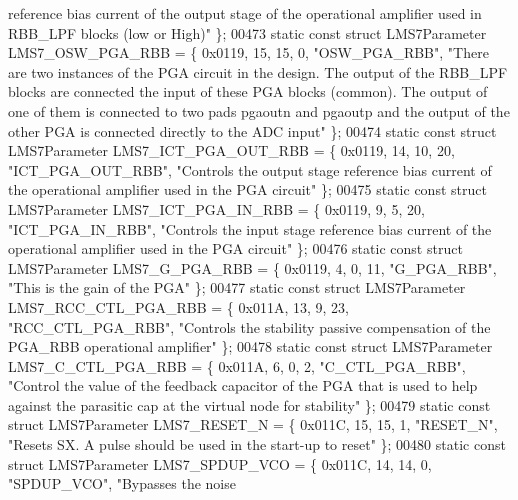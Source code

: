 \begin{DoxyCode}
{       reference bias current of the output stage of the operational amplifier used in RBB\_LPF blocks (low or High)"} \};
00473 \textcolor{keyword}{static} \textcolor{keyword}{const} \textcolor{keyword}{struct }LMS7Parameter LMS7_OSW_PGA_RBB = \{ 0x0119, 15, 15, 0, \textcolor{stringliteral}{"OSW\_PGA\_RBB"}, \textcolor{stringliteral}{"There are two
       instances of the PGA circuit in the design. The output of the RBB\_LPF blocks are connected the input of these
       PGA blocks (common). The output of one of them is connected to two pads pgaoutn and pgaoutp and the output of
       the other PGA is connected directly to the ADC input"} \};
00474 \textcolor{keyword}{static} \textcolor{keyword}{const} \textcolor{keyword}{struct }LMS7Parameter LMS7_ICT_PGA_OUT_RBB = \{ 0x0119, 14, 10, 20, \textcolor{stringliteral}{"ICT\_PGA\_OUT\_RBB"}, \textcolor{stringliteral}{"Controls
       the output stage reference bias current of the operational amplifier used in the PGA circuit"} \};
00475 \textcolor{keyword}{static} \textcolor{keyword}{const} \textcolor{keyword}{struct }LMS7Parameter LMS7_ICT_PGA_IN_RBB = \{ 0x0119, 9, 5, 20, \textcolor{stringliteral}{"ICT\_PGA\_IN\_RBB"}, \textcolor{stringliteral}{"Controls the
       input stage reference bias current of the operational amplifier used in the PGA circuit"} \};
00476 \textcolor{keyword}{static} \textcolor{keyword}{const} \textcolor{keyword}{struct }LMS7Parameter LMS7_G_PGA_RBB = \{ 0x0119, 4, 0, 11, \textcolor{stringliteral}{"G\_PGA\_RBB"}, \textcolor{stringliteral}{"This is the gain of
       the PGA"} \};
00477 \textcolor{keyword}{static} \textcolor{keyword}{const} \textcolor{keyword}{struct }LMS7Parameter LMS7_RCC_CTL_PGA_RBB = \{ 0x011A, 13, 9, 23, \textcolor{stringliteral}{"RCC\_CTL\_PGA\_RBB"}, \textcolor{stringliteral}{"Controls
       the stability passive compensation of the PGA\_RBB operational amplifier"} \};
00478 \textcolor{keyword}{static} \textcolor{keyword}{const} \textcolor{keyword}{struct }LMS7Parameter LMS7_C_CTL_PGA_RBB = \{ 0x011A, 6, 0, 2, \textcolor{stringliteral}{"C\_CTL\_PGA\_RBB"}, \textcolor{stringliteral}{"Control the
       value of the feedback capacitor of the PGA that is used to help against the parasitic cap at the virtual node
       for stability"} \};
00479 \textcolor{keyword}{static} \textcolor{keyword}{const} \textcolor{keyword}{struct }LMS7Parameter LMS7_RESET_N = \{ 0x011C, 15, 15, 1, \textcolor{stringliteral}{"RESET\_N"}, \textcolor{stringliteral}{"Resets SX. A pulse should
       be used in the start-up to reset"} \};
00480 \textcolor{keyword}{static} \textcolor{keyword}{const} \textcolor{keyword}{struct }LMS7Parameter LMS7_SPDUP_VCO = \{ 0x011C, 14, 14, 0, \textcolor{stringliteral}{"SPDUP\_VCO"}, \textcolor{stringliteral}{"Bypasses the noise
}
\end{DoxyCode}
